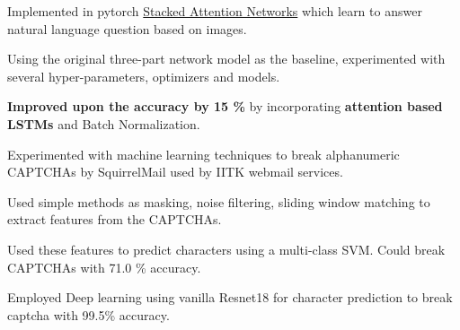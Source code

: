 \documentclass[a4paper]{norm-resume}
\begin{document}
\vspace{5mm}

  
\begin{tightitemize}
        \small{
        \item Implemented in pytorch \href{https://arxiv.org/abs/1511.02274}{Stacked Attention Networks} which learn to answer natural language question based on images.
        \item Using the original three-part network model as the baseline, experimented with several hyper-parameters, optimizers and models.
        \item \textbf{Improved upon the accuracy by 15 \%} by incorporating \textbf{attention based LSTMs} and Batch Normalization.
        }
\end{tightitemize}

\vspace{5mm}

 
\begin{tightitemize}
        \small{
        \item Experimented with machine learning techniques to break alphanumeric CAPTCHAs by SquirrelMail used by IITK webmail services. %
        \item Used simple methods as masking, noise filtering, sliding window matching to extract features from the CAPTCHAs.
        \item Used these features to predict characters using a multi-class SVM. Could break CAPTCHAs with 71.0 \% accuracy.
        \item Employed Deep learning using vanilla Resnet18 for character prediction to break captcha with 99.5\% accuracy.
        }
\end{tightitemize}

\vspace{5mm}
\end{document}
